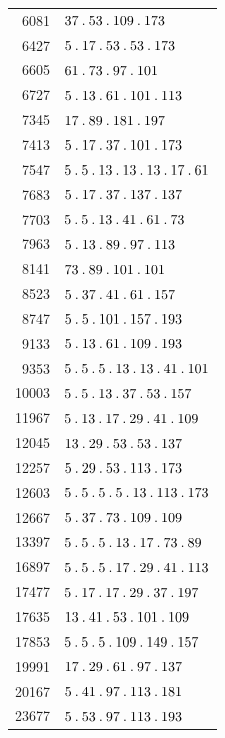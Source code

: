 \begin{longtable}{@{}r|l@{}}
6081 & $37\pdot 53\pdot 109\pdot 173$\\
6427 & $5\pdot 17\pdot 53\pdot 53\pdot 173$\\
6605 & $61\pdot 73\pdot 97\pdot 101$\\
6727 & $5\pdot 13\pdot 61\pdot 101\pdot 113$\\
7345 & $17\pdot 89\pdot 181\pdot 197$\\
7413 & $5\pdot 17\pdot 37\pdot 101\pdot 173$\\
7547 & $5\pdot 5\pdot 13\pdot 13\pdot 13\pdot 17\pdot 61$\\
7683 & $5\pdot 17\pdot 37\pdot 137\pdot 137$\\
7703 & $5\pdot 5\pdot 13\pdot 41\pdot 61\pdot 73$\\
7963 & $5\pdot 13\pdot 89\pdot 97\pdot 113$\\
8141 & $73\pdot 89\pdot 101\pdot 101$\\
8523 & $5\pdot 37\pdot 41\pdot 61\pdot 157$\\
8747 & $5\pdot 5\pdot 101\pdot 157\pdot 193$\\
9133 & $5\pdot 13\pdot 61\pdot 109\pdot 193$\\
9353 & $5\pdot 5\pdot 5\pdot 13\pdot 13\pdot 41\pdot 101$\\
10003 & $5\pdot 5\pdot 13\pdot 37\pdot 53\pdot 157$\\
11967 & $5\pdot 13\pdot 17\pdot 29\pdot 41\pdot 109$\\
12045 & $13\pdot 29\pdot 53\pdot 53\pdot 137$\\
12257 & $5\pdot 29\pdot 53\pdot 113\pdot 173$\\
12603 & $5\pdot 5\pdot 5\pdot 5\pdot 13\pdot 113\pdot 173$\\
12667 & $5\pdot 37\pdot 73\pdot 109\pdot 109$\\
13397 & $5\pdot 5\pdot 5\pdot 13\pdot 17\pdot 73\pdot 89$\\
16897 & $5\pdot 5\pdot 5\pdot 17\pdot 29\pdot 41\pdot 113$\\
17477 & $5\pdot 17\pdot 17\pdot 29\pdot 37\pdot 197$\\
17635 & $13\pdot 41\pdot 53\pdot 101\pdot 109$\\
17853 & $5\pdot 5\pdot 5\pdot 109\pdot 149\pdot 157$\\
19991 & $17\pdot 29\pdot 61\pdot 97\pdot 137$\\
20167 & $5\pdot 41\pdot 97\pdot 113\pdot 181$\\
23677 & $5\pdot 53\pdot 97\pdot 113\pdot 193$\\

\end{longtable}

